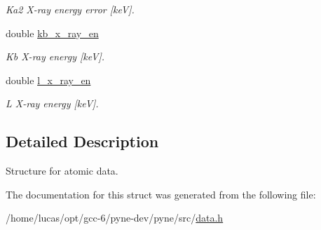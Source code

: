 \begin{DoxyCompactItemize}
\begin{DoxyCompactList}\small\item\em Ka2 X-\/ray energy error \mbox{[}keV\mbox{]}. \end{DoxyCompactList}\item 
double \hyperlink{structpyne_1_1atomic_aa93013778d65dc071c27564449e351de}{kb\+\_\+x\+\_\+ray\+\_\+en}\hypertarget{structpyne_1_1atomic_aa93013778d65dc071c27564449e351de}{}\label{structpyne_1_1atomic_aa93013778d65dc071c27564449e351de}

\begin{DoxyCompactList}\small\item\em Kb X-\/ray energy \mbox{[}keV\mbox{]}. \end{DoxyCompactList}\item 
double \hyperlink{structpyne_1_1atomic_a43e9e36e9b5bd8e4e77ffbe86b5ef28d}{l\+\_\+x\+\_\+ray\+\_\+en}\hypertarget{structpyne_1_1atomic_a43e9e36e9b5bd8e4e77ffbe86b5ef28d}{}\label{structpyne_1_1atomic_a43e9e36e9b5bd8e4e77ffbe86b5ef28d}

\begin{DoxyCompactList}\small\item\em L X-\/ray energy \mbox{[}keV\mbox{]}. \end{DoxyCompactList}\end{DoxyCompactItemize}


\subsection{Detailed Description}
Structure for atomic data. 

The documentation for this struct was generated from the following file\+:\begin{DoxyCompactItemize}
\item 
/home/lucas/opt/gcc-\/6/pyne-\/dev/pyne/src/\hyperlink{data_8h}{data.\+h}\end{DoxyCompactItemize}
